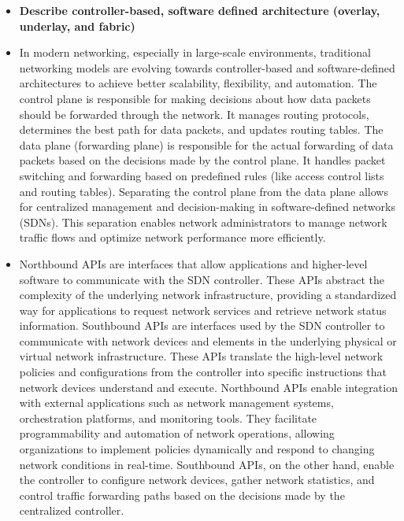 \documentclass{article}
\begin{document}
\begin{itemize}
  \item \textbf{Describe controller-based, software defined architecture (overlay, underlay, and fabric)} 
  	\item[] In modern networking, especially in large-scale environments, traditional networking models are evolving towards controller-based and software-defined architectures to achieve better scalability, flexibility, and automation. The control plane is responsible for making decisions about how data packets should be forwarded through the network. It manages routing protocols, determines the best path for data packets, and updates routing tables. The data plane (forwarding plane) is responsible for the actual forwarding of data packets based on the decisions made by the control plane. It handles packet switching and forwarding based on predefined rules (like access control lists and routing tables). Separating the control plane from the data plane allows for centralized management and decision-making in software-defined networks (SDNs). This separation enables network administrators to manage network traffic flows and optimize network performance more efficiently.
	\item[] Northbound APIs are interfaces that allow applications and higher-level software to communicate with the SDN controller. These APIs abstract the complexity of the underlying network infrastructure, providing a standardized way for applications to request network services and retrieve network status information. Southbound APIs are interfaces used by the SDN controller to communicate with network devices and elements in the underlying physical or virtual network infrastructure. These APIs translate the high-level network policies and configurations from the controller into specific instructions that network devices understand and execute. Northbound APIs enable integration with external applications such as network management systems, orchestration platforms, and monitoring tools. They facilitate programmability and automation of network operations, allowing organizations to implement policies dynamically and respond to changing network conditions in real-time. Southbound APIs, on the other hand, enable the controller to configure network devices, gather network statistics, and control traffic forwarding paths based on the decisions made by the centralized controller.

\end{itemize}
\end{document}
